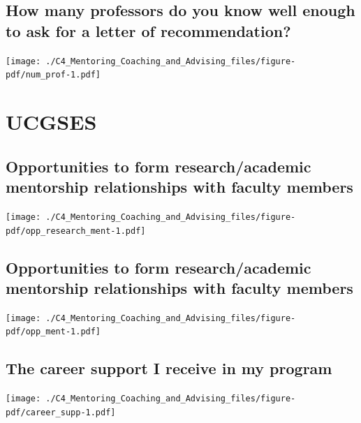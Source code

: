 \documentclass[
  letterpaper,
  DIV=11,
  numbers=noendperiod]{scrreprt}
\begin{document}
\hypertarget{how-many-professors-do-you-know-well-enough-to-ask-for-a-letter-of-recommendation}{%
\subsection{How many professors do you know well enough to ask for a
letter of
recommendation?}\label{how-many-professors-do-you-know-well-enough-to-ask-for-a-letter-of-recommendation}}

\texttt{[image: ./C4\_Mentoring\_Coaching\_and\_Advising\_files/figure-pdf/num\_prof-1.pdf]}

\hypertarget{ucgses}{%
\section{UCGSES}\label{ucgses}}

\hypertarget{opportunities-to-form-researchacademic-mentorship-relationships-with-faculty-members}{%
\subsection{Opportunities to form research/academic mentorship
relationships with faculty
members}\label{opportunities-to-form-researchacademic-mentorship-relationships-with-faculty-members}}

\texttt{[image: ./C4\_Mentoring\_Coaching\_and\_Advising\_files/figure-pdf/opp\_research\_ment-1.pdf]}

\hypertarget{opportunities-to-form-researchacademic-mentorship-relationships-with-faculty-members-1}{%
\subsection{Opportunities to form research/academic mentorship
relationships with faculty
members}\label{opportunities-to-form-researchacademic-mentorship-relationships-with-faculty-members-1}}

\texttt{[image: ./C4\_Mentoring\_Coaching\_and\_Advising\_files/figure-pdf/opp\_ment-1.pdf]}

\hypertarget{the-career-support-i-receive-in-my-program}{%
\subsection{The career support I receive in my
program}\label{the-career-support-i-receive-in-my-program}}

\texttt{[image: ./C4\_Mentoring\_Coaching\_and\_Advising\_files/figure-pdf/career\_supp-1.pdf]}
\end{document}
